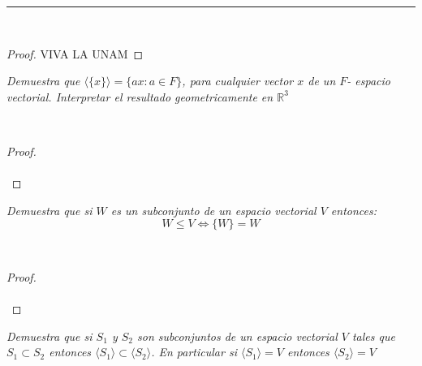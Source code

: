 \documentclass[11pt,letterpaper]{article}
\newcommand{\R}{\mathbb{R}}
\begin{document}
\rule{17cm}{0.1mm}

\,\\
\begin{proof}
VIVA LA UNAM
\end{proof}
\begin{tcolorbox}[
	title = \textcolor{black}{\textcolor{white}{Problema 45}},]
\textit{Demuestra que $\langle\{x\}\rangle=\{ax:a\in F\}$, para cualquier vector $x$ de un $F$- espacio vectorial. Interpretar el resultado geometricamente en $\R^3$
}
\end{tcolorbox}\,\\
\begin{proof}\,\\
    \,\\
\end{proof}
\begin{tcolorbox}[
	title = \textcolor{black}{\textcolor{white}{Problema 5}},]
\textit{Demuestra que si $W$ es un subconjunto de un espacio vectorial $V$ entonces:\,\\
\begin{equation*}
    W\leq V \iff \{W\}=W 
\end{equation*}
}
\end{tcolorbox}\,\\
\begin{proof}\,\\
    \,\\
\end{proof}
\begin{tcolorbox}[
	title = \textcolor{black}{\textcolor{white}{Problema 6}},]
\textit{Demuestra que si $S_1$ y $S_2$ son subconjuntos de un espacio vectorial $V$ tales que $S_1\subset S_2$
entonces $\langle S_1 \rangle \subset \langle S_2 \rangle$. En particular si $\langle S_1 \rangle =V$ entonces $\langle S_2 \rangle =V$
}
\end{tcolorbox}\,\\
\end{document}
